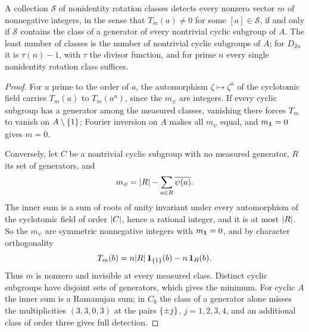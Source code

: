 \begin{theorem}\label{nab:thm:rotation}
A collection $\mathcal S$ of nonidentity rotation classes detects every nonzero vector $m$
of nonnegative integers, in the sense that $T_m(a)\ne0$ for some $[a]\in\mathcal S$, if and
only if $\mathcal S$ contains the class of a generator of every nontrivial cyclic subgroup
of $A$. The least number of classes is the number of nontrivial cyclic subgroups of $A$;
for $D_{2n}$ it is $\tau(n)-1$, with $\tau$ the divisor function, and for prime $n$ every
single nonidentity rotation class suffices.
\end{theorem}
\begin{proof}
For $u$ prime to the order of $a$, the automorphism $\zeta\mapsto\zeta^u$ of the
cyclotomic field carries $T_m(a)$ to $T_m(a^u)$, since the $m_\psi$ are integers. If every
cyclic subgroup has a generator among the measured classes, vanishing there forces $T_m$
to vanish on $A\setminus\{1\}$; Fourier inversion on $A$ makes all $m_\psi$ equal, and
$m_{\mathbf{1}}=0$ gives $m=0$.

Conversely, let $C$ be a nontrivial cyclic subgroup with no measured generator, $R$ its set
of generators, and
\[
 m_\psi=\lvert R\rvert-\sum_{a\in R}\overline{\psi(a)} .
\]
The inner sum is a sum of roots of unity invariant under every automorphism of the
cyclotomic field of order $\lvert C\rvert$, hence a rational integer, and it is at most $\lvert R\rvert$.
So the $m_\psi$ are symmetric nonnegative integers with $m_{\mathbf{1}}=0$, and by character
orthogonality
\[
 T_m(b)=n\lvert R\rvert\,\mathbf{1}_{\{1\}}(b)-n\,\mathbf{1}_R(b) .
\]
Thus $m$ is nonzero and invisible at every measured class. Distinct cyclic subgroups have
disjoint sets of generators, which gives the minimum. For cyclic $A$ the inner sum is a
Ramanujan sum; in $C_9$ the class of a generator alone misses the multiplicities
$(3,3,0,3)$ at the pairs $\{\pm j\}$, $j=1,2,3,4$, and an additional class of order three
gives full detection.
\end{proof}

